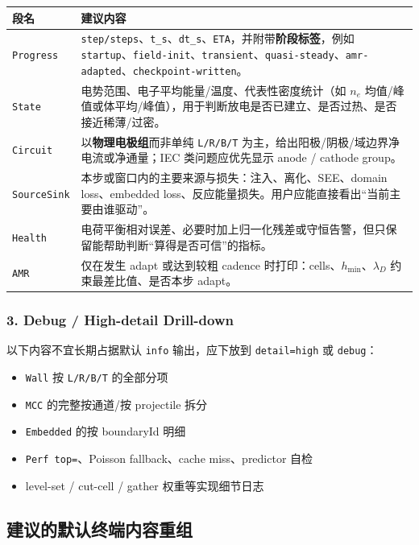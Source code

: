 \documentclass[11pt,a4paper]{ctexart}
\newcommand{\code}[1]{\texttt{#1}}
\begin{document}
\begin{longtable}{p{}p{}}
\toprule
段名 & 建议内容 \\
\midrule
\endhead
\code{Progress} & \code{step/steps}、\code{t\_s}、\code{dt\_s}、\code{ETA}，并附带\textbf{阶段标签}，例如 \code{startup}、\code{field-init}、\code{transient}、\code{quasi-steady}、\code{amr-adapted}、\code{checkpoint-written}。 \\
\code{State} & 电势范围、电子平均能量/温度、代表性密度统计（如 \(n_e\) 均值/峰值或体平均/峰值），用于判断放电是否已建立、是否过热、是否接近稀薄/过密。 \\
\code{Circuit} & 以\textbf{物理电极组}而非单纯 \code{L/R/B/T} 为主，给出阳极/阴极/域边界净电流或净通量；IEC 类问题应优先显示 anode / cathode group。 \\
\code{SourceSink} & 本步或窗口内的主要来源与损失：注入、离化、SEE、domain loss、embedded loss、反应能量损失。用户应能直接看出``当前主要由谁驱动''。 \\
\code{Health} & 电荷平衡相对误差、必要时加上归一化残差或守恒告警，但只保留能帮助判断``算得是否可信''的指标。 \\
\code{AMR} & 仅在发生 adapt 或达到较粗 cadence 时打印：cells、\(h_{\min}\)、\(\lambda_D\) 约束最差比值、是否本步 adapt。 \\
\bottomrule
\end{longtable}

\subsubsection{3. Debug / High-detail Drill-down}

以下内容不宜长期占据默认 \code{info} 输出，应下放到 \code{detail=high} 或 \code{debug}：

\begin{itemize}
  \item \code{Wall} 按 \code{L/R/B/T} 的全部分项
  \item \code{MCC} 的完整按通道/按 projectile 拆分
  \item \code{Embedded} 的按 boundaryId 明细
  \item \code{Perf top=}、Poisson fallback、cache miss、predictor 自检
  \item level-set / cut-cell / gather 权重等实现细节日志
\end{itemize}

\subsection{建议的默认终端内容重组}
\end{document}
